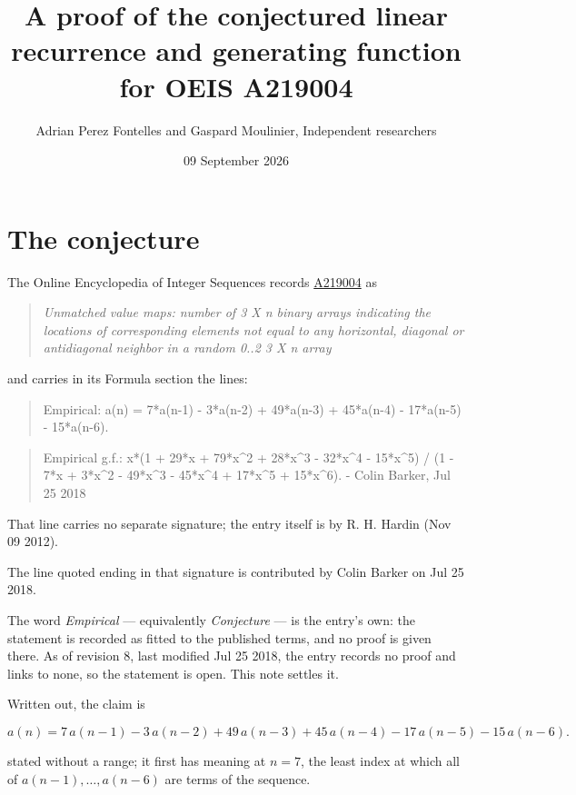\documentclass[11pt]{article}
\title{A proof of the conjectured linear recurrence and generating function for OEIS A219004}
\author{Adrian Perez Fontelles and Gaspard Moulinier, Independent researchers}
\date{09 September 2026}
\theoremstyle{definition}
\begin{document}
\maketitle
\section{The conjecture}

The Online Encyclopedia of Integer Sequences records \href{https://oeis.org/A219004}{A219004} as

\begin{quote}\itshape Unmatched value maps: number of 3 X n binary arrays indicating the locations of corresponding elements not equal to any horizontal, diagonal or antidiagonal neighbor in a random 0..2 3 X n array\end{quote}

and carries in its Formula section the lines:

\begin{quote}\ttfamily Empirical: a(n) = 7*a(n-1) - 3*a(n-2) + 49*a(n-3) + 45*a(n-4) - 17*a(n-5) - 15*a(n-6).\end{quote}

\begin{quote}\ttfamily Empirical g.f.: x*(1 + 29*x + 79*x\textasciicircum{}2 + 28*x\textasciicircum{}3 - 32*x\textasciicircum{}4 - 15*x\textasciicircum{}5) / (1 - 7*x + 3*x\textasciicircum{}2 - 49*x\textasciicircum{}3 - 45*x\textasciicircum{}4 + 17*x\textasciicircum{}5 + 15*x\textasciicircum{}6). - Colin Barker, Jul 25 2018\end{quote}

That line carries no separate signature; the entry itself is by R. H. Hardin (Nov 09 2012).

The line quoted ending in that signature is contributed by Colin Barker on Jul 25 2018.

The word {\itshape Empirical} --- equivalently {\itshape Conjecture} --- is the entry's own: the statement is recorded as fitted to the published terms, and no proof is given there. As of revision 8, last modified Jul 25 2018, the entry records no proof and links to none, so the statement is open. This note settles it.

Written out, the claim is

\[a(n) = 7\,a(n-1) - 3\,a(n-2) + 49\,a(n-3) + 45\,a(n-4) - 17\,a(n-5) - 15\,a(n-6).\]

stated without a range; it first has meaning at $n = 7$, the least index at which all of $a(n-1),\dots,a(n-6)$ are terms of the sequence.
\end{document}
